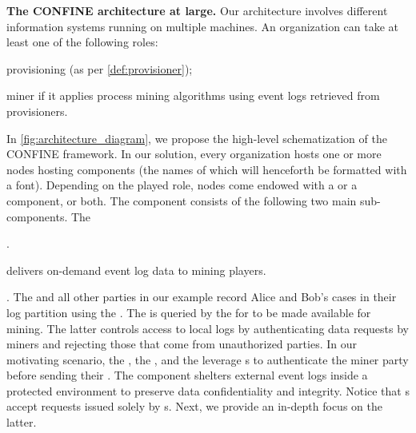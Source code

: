 \noindent\textbf{The CONFINE architecture at large.} Our architecture involves different information systems running on multiple machines. An organization can take at least one of the following roles: 
\begin{inparadesc}
\item[provisioning]  (as per \cref{def:provisioner});
\item[miner] if it applies process mining algorithms using event logs retrieved from provisioners.
\end{inparadesc}
In \cref{fig:architecture_diagram}, we propose the high-level schematization of the CONFINE framework.
In our solution, every organization hosts one or more nodes hosting components (the names of which will henceforth be formatted with a  font). Depending on the played role, nodes come endowed with a  or a  component, or both. The  component consists of the following two main sub-components. The \begin{inparadesc}
\item[\Compo{Log Recorder}] .
\item[\Compo{Log Provider}] delivers on-demand event log data to mining players.
\end{inparadesc}
. The  and all other parties in our example record Alice and Bob's cases in their log partition using the . The  is queried by the  for  to be made available for mining. The latter controls access to local %
logs by authenticating data requests by miners and rejecting those that come from unauthorized parties.
In our motivating scenario, the , the , and the  leverage s to authenticate the miner party before sending their . The  component
shelters external event logs inside a protected environment to preserve data confidentiality and integrity.
Notice that s accept requests issued solely by s. 
Next, we provide an in-depth focus on the latter.

